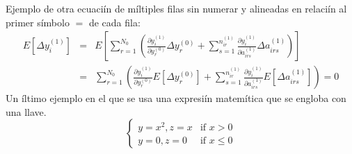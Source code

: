 Ejemplo de otra ecuaciín de míltiples filas sin numerar y alineadas en relaciín al primer símbolo $=$ de cada fila:
%
\begin{eqnarray*}
E[\Delta y_i^{(1)}] &=& E\left[\sum
\limits_{r=1}^{N_{0}} \left( \frac{\partial y_i^{(1)}}{\partial
y_r^{(0)}} \Delta y_r^{(0)} + \sum \limits_{s=1}^{n_{ir}^{(1)}}
\frac{\partial y_i^{(1)}}{\partial a_{irs}^{(1)}} \Delta
a_{irs}^{(1)} \right)\right] \\
&=& \sum \limits_{r=1}^{N_{0}} \left( \frac{\partial y_i^{(1)}}{\partial
y_r^{(0)}} E[\Delta y_r^{(0)}] + \sum \limits_{s=1}^{n_{ir}^{(1)}}
\frac{\partial y_i^{(1)}}{\partial a_{irs}^{(1)}} E[\Delta
a_{irs}^{(1)}] \right) = 0
\end{eqnarray*}
%
Un íltimo ejemplo en el que se usa una expresiín matemítica que se engloba con una llave.
%
\begin{equation}
\left\{ \begin{array}{ll}
  y = x^2, z = x & \mbox{if $x > 0$} \\
  y = 0, z = 0   & \mbox{if $x \leq 0$}
\end{array} \right.
\end{equation}
